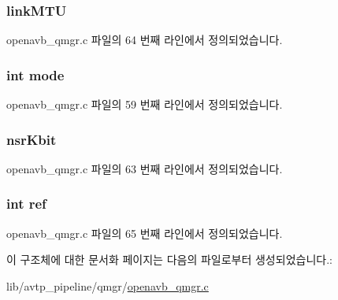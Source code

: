 \subsubsection[{\texorpdfstring{link\+M\+TU}{linkMTU}}]{ link\+M\+TU}\hypertarget{structqdisc__data__t_ad9503bcdf2668a6285abebf628f31735}{}\label{structqdisc__data__t_ad9503bcdf2668a6285abebf628f31735}


openavb\+\_\+qmgr.\+c 파일의 64 번째 라인에서 정의되었습니다.

\subsubsection[{\texorpdfstring{mode}{mode}}]{\setlength{\rightskip}{0pt plus 5cm}int mode}\hypertarget{structqdisc__data__t_a1ea5d0cb93f22f7d0fdf804bd68c3326}{}\label{structqdisc__data__t_a1ea5d0cb93f22f7d0fdf804bd68c3326}


openavb\+\_\+qmgr.\+c 파일의 59 번째 라인에서 정의되었습니다.

\subsubsection[{\texorpdfstring{nsr\+Kbit}{nsrKbit}}]{ nsr\+Kbit}\hypertarget{structqdisc__data__t_aded4a95008961f9b7002fb1da40c59b6}{}\label{structqdisc__data__t_aded4a95008961f9b7002fb1da40c59b6}


openavb\+\_\+qmgr.\+c 파일의 63 번째 라인에서 정의되었습니다.

\subsubsection[{\texorpdfstring{ref}{ref}}]{\setlength{\rightskip}{0pt plus 5cm}int ref}\hypertarget{structqdisc__data__t_adb528a1cb1ca190150183394d082590d}{}\label{structqdisc__data__t_adb528a1cb1ca190150183394d082590d}


openavb\+\_\+qmgr.\+c 파일의 65 번째 라인에서 정의되었습니다.



이 구조체에 대한 문서화 페이지는 다음의 파일로부터 생성되었습니다.\+:\begin{DoxyCompactItemize}
\item 
lib/avtp\+\_\+pipeline/qmgr/\hyperlink{openavb__qmgr_8c}{openavb\+\_\+qmgr.\+c}\end{DoxyCompactItemize}
